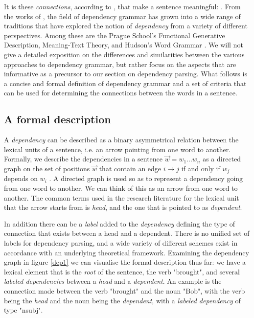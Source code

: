 It is these \textit{connections}, according to \citeauthor{Tes:15}, that make a sentence meaningful:  \cite{Tes:15}. From the works of \citeauthor{Tes:15}, the field of dependency grammar has grown into a wide range of traditions that have explored the notion of \textit{dependency} from a variety of different perspectives. Among these are the Prague School's Functional Generative Description, Meaning-Text Theory, and Hudson's Word Grammar \cite{Sgall:86, Mel:88, Hudson:90}. We will not give a detailed exposition on the differences and similarities between the various approaches to dependency grammar, but rather focus on the aspects that are informative as a precursor to our section on dependency parsing. What follows is a concise and formal definition of dependency grammar and a set of criteria that can be used for determining the connections between the words in a sentence.

\subsection{A formal description}
A \textit{dependency} can be described as a binary asymmetrical relation between the lexical units of a sentence, i.e. an arrow pointing from one word to another. Formally, we describe the dependencies in a sentence $\vec{w} = w_1 ... w_n$ as a directed graph on the set of positions $\vec{w}$ that contain an edge $i \rightarrow j$ if and only if $w_j$ depends on $w_i$ \cite{Kuhl:10}. A directed graph is used so as to represent a dependency going from one word to another. We can think of this as an arrow from one word to another. The common terms used in the research literature for the lexical unit that the arrow starts from is \textit{head}, and the one that is pointed to as \textit{dependent}. 

In addition there can be a \textit{label} added to the \textit{dependency} defining the type of connection that exists between a head and a dependent. There is no unified set of labels for dependency parsing, and a wide variety of different schemes exist in accordance with an underlying theoretical framework. Examining the dependency graph in figure \ref{dep1} we can visualise the formal description thus far: we have a lexical element that is the \textit{root} of the sentence, the verb "brought", and several \textit{labeled dependencies} between a \textit{head} and a \textit{dependent}. An example is the connection made between the verb "brought" and the noun "Bob", with the verb being the \textit{head} and the noun being the \textit{dependent}, with a \textit{labeled dependency} of type "nsubj".

